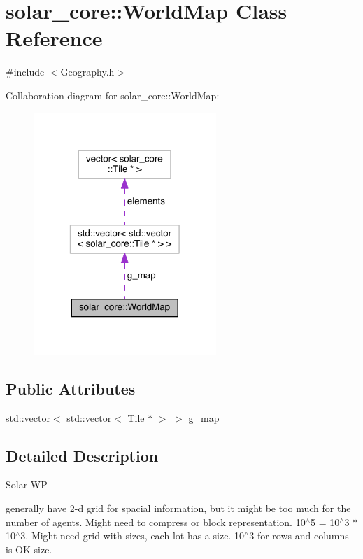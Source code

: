 \hypertarget{classsolar__core_1_1_world_map}{}\section{solar\+\_\+core\+:\+:World\+Map Class Reference}
\label{classsolar__core_1_1_world_map}


{\ttfamily \#include $<$Geography.\+h$>$}



Collaboration diagram for solar\+\_\+core\+:\+:World\+Map\+:
\nopagebreak
\begin{figure}[H]
\begin{center}
\leavevmode
\includegraphics[width=196pt]{classsolar__core_1_1_world_map__coll__graph}
\end{center}
\end{figure}
\subsection*{Public Attributes}
\begin{DoxyCompactItemize}
\item 
std\+::vector$<$ std\+::vector$<$ \hyperlink{classsolar__core_1_1_tile}{Tile} $\ast$ $>$ $>$ \hyperlink{classsolar__core_1_1_world_map_a2b94f74fcea57d3e01d8cab8348e1c48}{g\+\_\+map}
\end{DoxyCompactItemize}


\subsection{Detailed Description}
\begin{DoxyRefDesc}{Solar W\+P}
\item[\hyperlink{wp__wp000003}{Solar W\+P}]generally have 2-\/d grid for spacial information, but it might be too much for the number of agents. Might need to compress or block representation. 10$^\wedge$5 = 10$^\wedge$3 $\ast$ 10$^\wedge$3. Might need grid with sizes, each lot has a size. 10$^\wedge$3 for rows and columns is O\+K size.\end{DoxyRefDesc}


